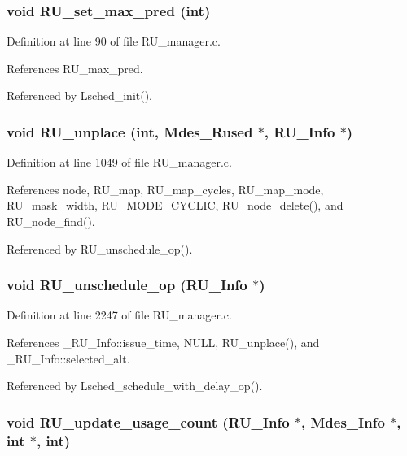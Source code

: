 \subsubsection{\setlength{\rightskip}{0pt plus 5cm}void RU\_\-set\_\-max\_\-pred (int)}\label{RU__manager_8h_d3869bd24daa61c7855389ad6bb52e9a}




Definition at line 90 of file RU\_\-manager.c.

References RU\_\-max\_\-pred.

Referenced by Lsched\_\-init().
\subsubsection{\setlength{\rightskip}{0pt plus 5cm}void RU\_\-unplace (int, Mdes\_\-Rused $\ast$, \bf{RU\_\-Info} $\ast$)}\label{RU__manager_8h_57a602b677e350820ecfaff8b30736be}




Definition at line 1049 of file RU\_\-manager.c.

References node, RU\_\-map, RU\_\-map\_\-cycles, RU\_\-map\_\-mode, RU\_\-mask\_\-width, RU\_\-MODE\_\-CYCLIC, RU\_\-node\_\-delete(), and RU\_\-node\_\-find().

Referenced by RU\_\-unschedule\_\-op().
\subsubsection{\setlength{\rightskip}{0pt plus 5cm}void RU\_\-unschedule\_\-op (\bf{RU\_\-Info} $\ast$)}\label{RU__manager_8h_34cd3c8b997e2f6edd2d3e56b6ba4a7d}




Definition at line 2247 of file RU\_\-manager.c.

References \_\-RU\_\-Info::issue\_\-time, NULL, RU\_\-unplace(), and \_\-RU\_\-Info::selected\_\-alt.

Referenced by Lsched\_\-schedule\_\-with\_\-delay\_\-op().
\subsubsection{\setlength{\rightskip}{0pt plus 5cm}void RU\_\-update\_\-usage\_\-count (\bf{RU\_\-Info} $\ast$, Mdes\_\-Info $\ast$, int $\ast$, int)}\label{RU__manager_8h_7d710d79c094efeca8b2494f51f14175}




